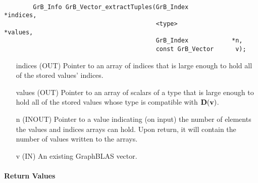 \paragraph{\syntax}

\begin{verbatim}
        GrB_Info GrB_Vector_extractTuples(GrB_Index            *indices,
                                          <type>               *values,
                                          GrB_Index            *n, 
                                          const GrB_Vector      v);

\end{verbatim}

\begin{itemize}[leftmargin=1.1in]
    \item[{\sf indices}] ({\sf OUT}) Pointer to an array of indices that is
                        large enough to hold all of the stored values' indices.
    \item[{\sf values}] ({\sf OUT}) Pointer to an array of scalars of a type 
                        that is large enough to hold all of the stored values
                        whose type is compatible with $\mathbf{D}({\bf v})$.
    \item[{\sf n}] ({\sf INOUT}) Pointer to a value indicating (on input) the number of
                        elements the {\sf values} and
                        {\sf indices} arrays can hold. Upon return, it will contain the
                        number of values written to the arrays.
    \item[{\sf v}]      ({\sf IN})  An existing GraphBLAS vector.
\end{itemize}

\paragraph{Return Values}

